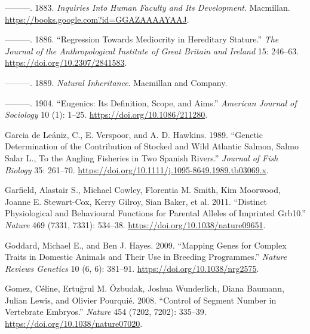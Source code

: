 \documentclass[
]{book}
\newlength{\cslhangindent}
\newlength{\cslentryspacingunit} %
\newenvironment{CSLReferences}[2] %
 {%
  \setlength{\parindent}{0pt}
  \ifodd #1
  \let\oldpar\par
  \def\par{\hangindent=\cslhangindent\oldpar}
  \fi
  \setlength{\parskip}{#2\cslentryspacingunit}
 }%
 {}
\begin{document}
\begin{CSLReferences}{1}{0}
\leavevmode{}%
---------. 1883. \emph{Inquiries {Into Human Faculty} and {Its Development}}. {Macmillan}. \url{https://books.google.com?id=GGAZAAAAYAAJ}.

\leavevmode{}%
---------. 1886. {``Regression {Towards Mediocrity} in {Hereditary Stature}.''} \emph{The Journal of the Anthropological Institute of Great Britain and Ireland} 15: 246--63. \url{https://doi.org/10.2307/2841583}.

\leavevmode{}%
---------. 1889. \emph{Natural Inheritance}. {Macmillan and Company}.

\leavevmode{}%
---------. 1904. {``Eugenics: {Its Definition}, {Scope}, and {Aims}.''} \emph{American Journal of Sociology} 10 (1): 1--25. \url{https://doi.org/10.1086/211280}.

\leavevmode{}%
Garcia de Leániz, C., E. Verspoor, and A. D. Hawkins. 1989. {``Genetic Determination of the Contribution of Stocked and Wild {Atlantic} Salmon, {Salmo} Salar {L}., To the Angling Fisheries in Two {Spanish} Rivers.''} \emph{Journal of Fish Biology} 35: 261--70. \url{https://doi.org/10.1111/j.1095-8649.1989.tb03069.x}.

\leavevmode{}%
Garfield, Alastair S., Michael Cowley, Florentia M. Smith, Kim Moorwood, Joanne E. Stewart-Cox, Kerry Gilroy, Sian Baker, et al. 2011. {``Distinct Physiological and Behavioural Functions for Parental Alleles of Imprinted {Grb10}.''} \emph{Nature} 469 (7331, 7331): 534--38. \url{https://doi.org/10.1038/nature09651}.

\leavevmode{}%
Goddard, Michael E., and Ben J. Hayes. 2009. {``Mapping Genes for Complex Traits in Domestic Animals and Their Use in Breeding Programmes.''} \emph{Nature Reviews Genetics} 10 (6, 6): 381--91. \url{https://doi.org/10.1038/nrg2575}.

\leavevmode{}%
Gomez, Céline, Ertuğrul M. Özbudak, Joshua Wunderlich, Diana Baumann, Julian Lewis, and Olivier Pourquié. 2008. {``Control of Segment Number in Vertebrate Embryos.''} \emph{Nature} 454 (7202, 7202): 335--39. \url{https://doi.org/10.1038/nature07020}.


\end{CSLReferences}
\end{document}
